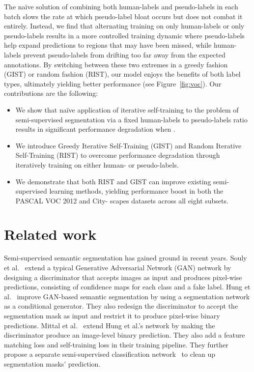 \documentclass[10pt, conference, compsocconf]{IEEEtran}
\begin{document}
The na\"ive solution of combining both human-labels and pseudo-labels in each batch slows the rate at which pseudo-label bloat occurs but does not combat it entirely. Instead, we find that alternating training on only human-labels or only pseudo-labels results in a more controlled training dynamic where pseudo-labels help expand predictions to regions that may have been missed, while human-labels prevent pseudo-labels from drifting too far away from the expected annotations. By switching between these two extremes in a greedy fashion (GIST) or random fashion (RIST), our model enjoys the benefits of both label types, ultimately yielding better performance (see Figure~\ref{fig:voc}). Our contributions are the following:
\begin{itemize}
    \itemsep-0em
    \item We show that na\"ive application of iterative self-training to the problem of semi-supervised segmentation via a fixed human-labels to pseudo-labels ratio results in significant performance degradation when .
    \item We introduce Greedy Iterative Self-Training (GIST) and Random Iterative Self-Training (RIST) to overcome performance degradation through iteratively training on either human- or pseudo-labels.
    \item  We demonstrate that both RIST and GIST can improve existing semi-supervised learning methods, yielding performance boost in both the PASCAL VOC 2012 and City- scapes datasets across all eight subsets.
\end{itemize}

\addtocounter{footnote}{1}

\section{Related work}\label{sec:related_work}
 
Semi-supervised semantic segmentation has gained ground in recent years. 
Souly et al.~\cite{souly2017semi} extend a typical Generative Adversarial Network (GAN) network by designing a discriminator that accepts images as input and produces pixel-wise predictions, consisting of confidence maps for each class and a fake label. Hung et al.~\cite{hung2019adversarial} improve GAN-based semantic segmentation by using a segmentation network as a conditional generator.  They also redesign the discriminator to accept the segmentation mask as input and restrict it to produce pixel-wise binary predictions. Mittal et al.~\cite{mittal2019semi} extend Hung et al.'s network by making the discriminator produce an image-level binary prediction. They also add a feature matching loss and self-training loss in their training pipeline. 
They further propose a separate semi-supervised classification network~\cite{tarvainen2017mean} to clean up segmentation masks' prediction.
\end{document}
